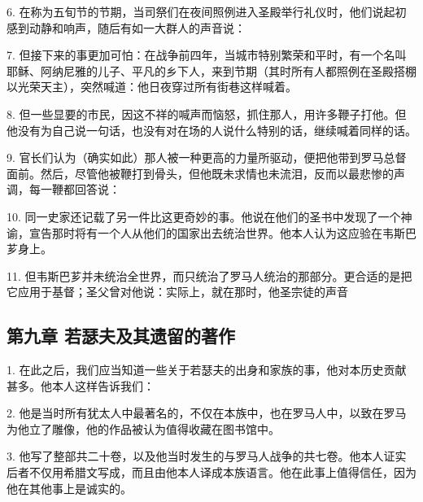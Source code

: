 6. 在称为五旬节的节期，当司祭们在夜间照例进入圣殿举行礼仪时，他们说起初感到动静和响声，随后有如一大群人的声音说：\par

7. 但接下来的事更加可怕：在战争前四年，当城市特别繁荣和平时，有一个名叫耶稣、阿纳尼雅的儿子、平凡的乡下人，来到节期（其时所有人都照例在圣殿搭棚以光荣天主），突然喊道：他日夜穿过所有街巷这样喊着。\par

8. 但一些显要的市民，因这不祥的喊声而恼怒，抓住那人，用许多鞭子打他。但他没有为自己说一句话，也没有对在场的人说什么特别的话，继续喊着同样的话。\par

9. 官长们认为（确实如此）那人被一种更高的力量所驱动，便把他带到罗马总督面前。然后，尽管他被鞭打到骨头，但他既未求情也未流泪，反而以最悲惨的声调，每一鞭都回答说：\par

10. 同一史家还记载了另一件比这更奇妙的事。他说在他们的圣书中发现了一个神谕，宣告那时将有一个人从他们的国家出去统治世界。他本人认为这应验在韦斯巴芗身上。\par

11. 但韦斯巴芗并未统治全世界，而只统治了罗马人统治的那部分。更合适的是把它应用于基督；圣父曾对他说：实际上，就在那时，他圣宗徒的声音\par


\subsection{第九章  若瑟夫及其遗留的著作}

1. 在此之后，我们应当知道一些关于若瑟夫的出身和家族的事，他对本历史贡献甚多。他本人这样告诉我们：\par

2. 他是当时所有犹太人中最著名的，不仅在本族中，也在罗马人中，以致在罗马为他立了雕像，他的作品被认为值得收藏在图书馆中。\par

3. 他写了整部共二十卷，以及他当时发生的与罗马人战争的共七卷。他本人证实后者不仅用希腊文写成，而且由他本人译成本族语言。他在此事上值得信任，因为他在其他事上是诚实的。\par

